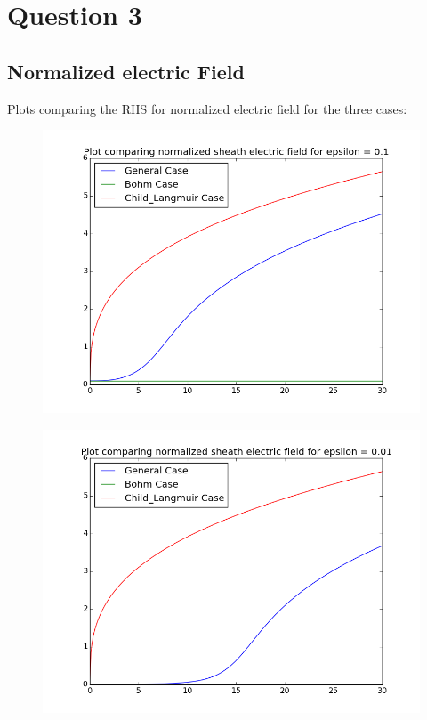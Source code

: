 \documentclass[11pt, a4paper]{article}
\begin{document}
\section{Question 3}
\subsection{Normalized electric Field}
Plots comparing the RHS for normalized electric field for the three cases:
\begin{figure}[H]
 \centering
 \includegraphics[width = \textwidth]{q3Eeps1.png}
\end{figure}
\begin{figure}[H]
 \centering
 \includegraphics[width = \textwidth]{q3Eeps2.png}
\end{figure}
\end{document}
